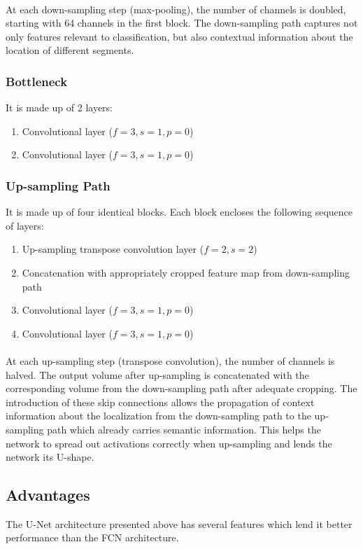 \documentclass[12pt, a4paper]{report}
\begin{document}
\paragraph{}
At each down-sampling step (max-pooling), the number of channels is doubled, starting with 64 channels in the first block. The down-sampling path captures not only features relevant to classification, but also contextual information about the location of different segments.
\subsubsection{Bottleneck}
It is made up of 2 layers:
\begin{enumerate}
	\item Convolutional layer ($f=3, s=1, p=0$)
	\item Convolutional layer ($f=3, s=1, p=0$)
\end{enumerate}
\subsubsection{Up-sampling Path}
It is made up of four identical blocks. Each block encloses the following sequence of layers:
\begin{enumerate}
	\item Up-sampling transpose convolution layer ($f=2, s=2$)
	\item Concatenation with appropriately cropped feature map from down-sampling path
	\item Convolutional layer ($f=3, s=1, p=0$)
	\item Convolutional layer ($f=3, s=1, p=0$)
\end{enumerate}
\paragraph{}
At each up-sampling step (transpose convolution), the number of channels is halved. The output volume after up-sampling is concatenated with the corresponding volume from the down-sampling path after adequate cropping. The introduction of these skip connections allows the propagation of context information about the localization from the down-sampling path to the up-sampling path which already carries semantic information. This helps the network to spread out activations correctly when up-sampling and lends the network its U-shape.
\subsection{Advantages}
The U-Net architecture presented above has several features which lend it better performance than the FCN architecture.
\end{document}
